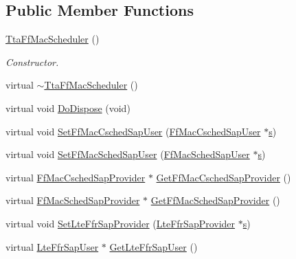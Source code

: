 \subsection*{Public Member Functions}
\begin{DoxyCompactItemize}
\item 
\hyperlink{classns3_1_1TtaFfMacScheduler_acf57e9c1615d3e312a4fc3a9748f72ed}{Tta\+Ff\+Mac\+Scheduler} ()
\begin{DoxyCompactList}\small\item\em Constructor. \end{DoxyCompactList}\item 
virtual \hyperlink{classns3_1_1TtaFfMacScheduler_a6e5741ac171c6cbfd278297876b50c4e}{$\sim$\+Tta\+Ff\+Mac\+Scheduler} ()
\item 
virtual void \hyperlink{classns3_1_1TtaFfMacScheduler_ad3d4985db1ebff0babefc8a6a5a2f132}{Do\+Dispose} (void)
\item 
virtual void \hyperlink{classns3_1_1TtaFfMacScheduler_a8460e8e459ee56c2e003c96277069ad2}{Set\+Ff\+Mac\+Csched\+Sap\+User} (\hyperlink{classns3_1_1FfMacCschedSapUser}{Ff\+Mac\+Csched\+Sap\+User} $\ast$\hyperlink{generate__test__data__lte__sinr_8m_ad83eeb3a142285d1243a08c6b7026df8}{s})
\item 
virtual void \hyperlink{classns3_1_1TtaFfMacScheduler_a7e11d920bdd5a74375f56a520a7b3f94}{Set\+Ff\+Mac\+Sched\+Sap\+User} (\hyperlink{classns3_1_1FfMacSchedSapUser}{Ff\+Mac\+Sched\+Sap\+User} $\ast$\hyperlink{generate__test__data__lte__sinr_8m_ad83eeb3a142285d1243a08c6b7026df8}{s})
\item 
virtual \hyperlink{classns3_1_1FfMacCschedSapProvider}{Ff\+Mac\+Csched\+Sap\+Provider} $\ast$ \hyperlink{classns3_1_1TtaFfMacScheduler_a102fd6e0f2ea3080e0754c0f2b9dbe8d}{Get\+Ff\+Mac\+Csched\+Sap\+Provider} ()
\item 
virtual \hyperlink{classns3_1_1FfMacSchedSapProvider}{Ff\+Mac\+Sched\+Sap\+Provider} $\ast$ \hyperlink{classns3_1_1TtaFfMacScheduler_a9d38ae91289743cb4df5cbee6767877a}{Get\+Ff\+Mac\+Sched\+Sap\+Provider} ()
\item 
virtual void \hyperlink{classns3_1_1TtaFfMacScheduler_a574a79d890d7b5b081682b6e934aac93}{Set\+Lte\+Ffr\+Sap\+Provider} (\hyperlink{classns3_1_1LteFfrSapProvider}{Lte\+Ffr\+Sap\+Provider} $\ast$\hyperlink{generate__test__data__lte__sinr_8m_ad83eeb3a142285d1243a08c6b7026df8}{s})
\item 
virtual \hyperlink{classns3_1_1LteFfrSapUser}{Lte\+Ffr\+Sap\+User} $\ast$ \hyperlink{classns3_1_1TtaFfMacScheduler_a4ced2cb91c600de0c0c74556c7c455cf}{Get\+Lte\+Ffr\+Sap\+User} ()

\end{DoxyCompactItemize}
